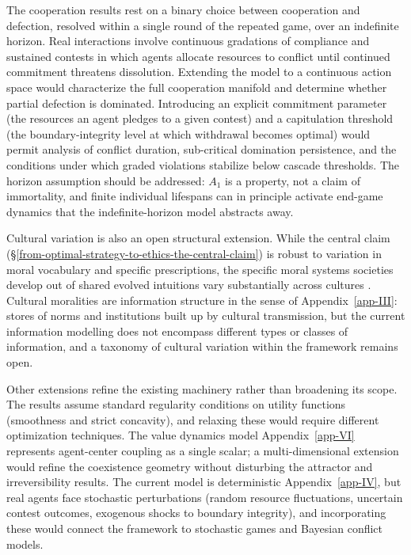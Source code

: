 \documentclass[11pt]{article}
\theoremstyle{plain}
\theoremstyle{definition}
\theoremstyle{remark}
\begin{document}
The cooperation results rest on a binary choice between cooperation and
defection, resolved within a single round of the repeated game, over an
indefinite horizon. Real interactions involve continuous gradations of
compliance and sustained contests in which agents allocate resources to
conflict until continued commitment threatens dissolution. Extending the
model to a continuous action space would characterize the full
cooperation manifold and determine whether partial defection is
dominated. Introducing an explicit commitment parameter (the resources
an agent pledges to a given contest) and a capitulation threshold (the
boundary-integrity level at which withdrawal becomes optimal) would
permit analysis of conflict duration, sub-critical domination
persistence, and the conditions under which graded violations stabilize
below cascade thresholds. The horizon assumption should be addressed:
\(A_1\) is a property, not a claim of immortality, and finite individual
lifespans can in principle activate end-game dynamics that the
indefinite-horizon model abstracts away.

Cultural variation is also an open structural extension. While the
central claim (§\ref{from-optimal-strategy-to-ethics-the-central-claim})
is robust to variation in moral vocabulary and specific prescriptions,
the specific moral systems societies develop out of shared evolved
intuitions vary substantially across cultures \citep{Haidt2010}.
Cultural moralities are information structure in the sense of
Appendix~\ref{app-III}: stores of norms and institutions built up by
cultural transmission, but the current information modelling does not
encompass different types or classes of information, and a taxonomy of
cultural variation within the framework remains open.

Other extensions refine the existing machinery rather than broadening
its scope. The results assume standard regularity conditions on utility
functions (smoothness and strict concavity), and relaxing these would
require different optimization techniques. The value dynamics model
Appendix~\ref{app-VI} represents agent-center coupling as a single
scalar; a multi-dimensional extension would refine the coexistence
geometry without disturbing the attractor and irreversibility results.
The current model is deterministic Appendix~\ref{app-IV}, but real
agents face stochastic perturbations (random resource fluctuations,
uncertain contest outcomes, exogenous shocks to boundary integrity), and
incorporating these would connect the framework to stochastic games and
Bayesian conflict models.
\end{document}

